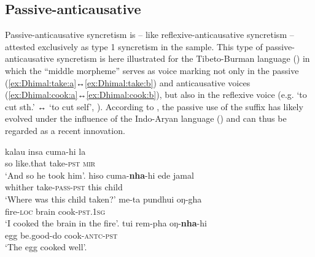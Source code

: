\subsection{Passive-anticausative} \label{sec:simple-syncretism:pass-antc}
Passive-anticausative syncretism is -- like reflexive-anticausative syncretism -- attested exclusively as type 1 syncretism in the sample. This type of passive-anticausative syncretism is here illustrated for the Tibeto-Burman language  () in which the “middle morpheme”  serves as voice marking not only in the passive (\ref{ex:Dhimal:take:a}↔\ref{ex:Dhimal:take:b}) and anticausative voices (\ref{ex:Dhimal:cook:a}↔\ref{ex:Dhimal:cook:b}), but also in the reflexive voice (e.g.  ‘to cut sth.’ ↔  ‘to cut self’, \citealt[527]{king:j:2009}). According to \cite[239]{khatiwada:2016}, the passive use of the suffix has likely evolved under the influence of the Indo-Aryan language  () and can thus be regarded as a recent innovation. 

\ea {} \citep[189, 459, 604]{king:j:2009}
\ea\label{ex:Dhimal:take:a}
	\gll	kalau insa cuma-hi la \\
			so like.that take-\textsc{pst} \textsc{mir} \\
	\glt	‘And so he took him’.
\ex\label{ex:Dhimal:take:b}
	\gll	hiso cuma-\textbf{nha}-hi ede jamal \\
			whither take-\textsc{pass-pst} this child \\
	\glt	‘Where was this child taken?’
\ex\label{ex:Dhimal:cook:a}
	\gll	me-ta pundhui oŋ-gha \\
			fire-\textsc{loc} brain cook-\textsc{pst.1sg} \\
	\glt	‘I cooked the brain in the fire’.
\ex\label{ex:Dhimal:cook:b}
	\gll	tui rem-pha oŋ-\textbf{nha}-hi \\
			egg be.good-do cook-\textsc{antc-pst} \\
	\glt	‘The egg cooked well’.
	\z 
\z

